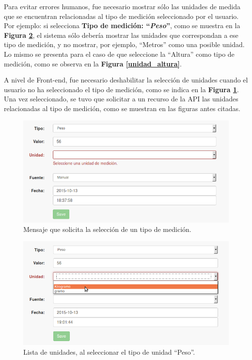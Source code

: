 Para evitar errores humanos, fue necesario mostrar sólo las unidades de medida que se encuentran relacionadas al tipo de medición seleccionado por el usuario.
Por ejemplo: si selecciona \textbf{Tipo de medición: ``\textit{Peso}''}, como se muestra en la \textbf{Figura \ref{unidad_peso}}, el sistema sólo debería mostrar las unidades que correspondan a ese tipo de medición, y no mostrar, por ejemplo, ``Metros'' como una posible unidad. Lo mismo se presenta para el caso de que seleccione la ``Altura'' como tipo de medición, como se observa en la \textbf{Figura \ref{unidad_altura}}.

A nivel de Front-end, fue necesario deshabilitar la selección de unidades cuando el usuario no ha seleccionado el tipo de medición, como se indica en la \textbf{Figura \ref{msj_seleccione_tipo}}.
Una vez seleccionado, se tuvo que solicitar a un recurso de la API las unidades relacionadas al tipo de medición, como se muestran en las figuras antes citadas.

 
 \begin{figure}[h]
  \centering
  \includegraphics[width=.8\textwidth]{img/3-selecciona_tipo}
  \caption{Mensaje que solicita la selección de un tipo de medición.}
  \label{msj_seleccione_tipo}
\end{figure}

\begin{figure}[h]
  \centering
  \includegraphics[width=.8\textwidth]{img/3-unidad_peso}
  \caption{Lista de unidades, al seleccionar el tipo de unidad ``Peso''.}
  \label{unidad_peso}
\end{figure}

